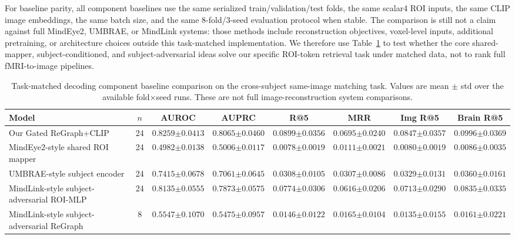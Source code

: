 \documentclass{article}
\begin{document}
For baseline parity, all component baselines use the same serialized train/validation/test folds, the same scalar4 ROI inputs, the same CLIP image embeddings, the same batch size, and the same 8-fold/3-seed evaluation protocol when stable. The comparison is still not a claim against full MindEye2, UMBRAE, or MindLink systems: those methods include reconstruction objectives, voxel-level inputs, additional pretraining, or architecture choices outside this task-matched implementation. We therefore use Table~\ref{tab:sota_baselines} to test whether the core shared-mapper, subject-conditioned, and subject-adversarial ideas solve our specific ROI-token retrieval task under matched data, not to rank full fMRI-to-image pipelines.

\begin{table}[!htbp]
  \centering
  \caption{Task-matched decoding component baseline comparison on the cross-subject same-image matching task. Values are mean $\pm$ std over the available fold$\times$seed runs. These are not full image-reconstruction system comparisons.}
  \label{tab:sota_baselines}
  \scriptsize
  \setlength{\tabcolsep}{2.8pt}
  \renewcommand{\arraystretch}{1.15}
  \begin{tabular}{lccccccc}
    \toprule
    Model & $n$ & AUROC & AUPRC & R@5 & MRR & Img R@5 & Brain R@5 \\
    \midrule
    Our Gated ReGraph+CLIP
    & 24 & $\mathbf{0.8259{\scriptstyle\pm0.0413}}$ & $\mathbf{0.8065{\scriptstyle\pm0.0460}}$ & $\mathbf{0.0899{\scriptstyle\pm0.0356}}$ & $\mathbf{0.0695{\scriptstyle\pm0.0240}}$ & $\mathbf{0.0847{\scriptstyle\pm0.0357}}$ & $\mathbf{0.0996{\scriptstyle\pm0.0369}}$ \\
    MindEye2-style shared ROI mapper
    & 24 & $0.4982{\scriptstyle\pm0.0138}$ & $0.5006{\scriptstyle\pm0.0117}$ & $0.0078{\scriptstyle\pm0.0019}$ & $0.0111{\scriptstyle\pm0.0021}$ & $0.0080{\scriptstyle\pm0.0019}$ & $0.0086{\scriptstyle\pm0.0035}$ \\
    UMBRAE-style subject encoder
    & 24 & $0.7415{\scriptstyle\pm0.0678}$ & $0.7061{\scriptstyle\pm0.0645}$ & $0.0308{\scriptstyle\pm0.0105}$ & $0.0307{\scriptstyle\pm0.0086}$ & $0.0329{\scriptstyle\pm0.0131}$ & $0.0360{\scriptstyle\pm0.0161}$ \\
    MindLink-style subject-adversarial ROI-MLP
    & 24 & $0.8135{\scriptstyle\pm0.0555}$ & $0.7873{\scriptstyle\pm0.0575}$ & $0.0774{\scriptstyle\pm0.0306}$ & $0.0616{\scriptstyle\pm0.0206}$ & $0.0713{\scriptstyle\pm0.0290}$ & $0.0835{\scriptstyle\pm0.0335}$ \\
    MindLink-style subject-adversarial ReGraph
    & 8 & $0.5547{\scriptstyle\pm0.1070}$ & $0.5475{\scriptstyle\pm0.0957}$ & $0.0146{\scriptstyle\pm0.0122}$ & $0.0165{\scriptstyle\pm0.0104}$ & $0.0135{\scriptstyle\pm0.0155}$ & $0.0161{\scriptstyle\pm0.0221}$ \\
    \bottomrule
  \end{tabular}
\end{table}
\end{document}
